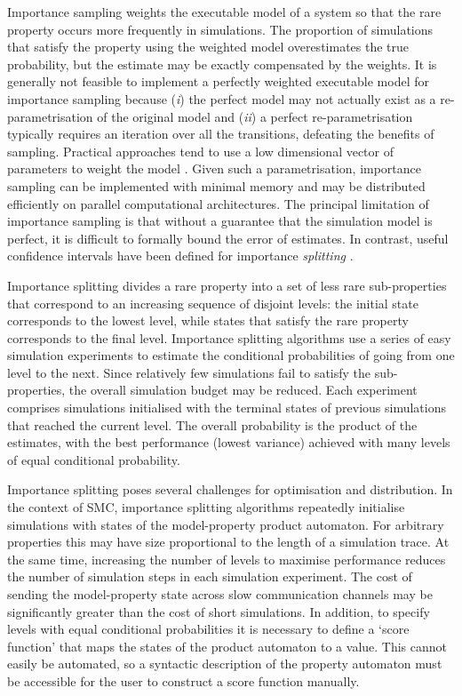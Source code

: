 \documentclass{llncs}
\begin{document}
Importance sampling weights the executable model of a system so that
the rare property occurs more frequently in simulations. The proportion
of simulations that satisfy the property using the weighted model
overestimates the true probability, but the estimate may be exactly
compensated by the weights. It is generally not feasible to implement
a perfectly weighted executable model for importance sampling because
(\emph{i}) the perfect model may not actually exist as a re-parametrisation
of the original model and (\emph{ii}) a perfect re-parametrisation
typically requires an iteration over all the transitions, defeating
the benefits of sampling. Practical approaches tend to use a low dimensional
vector of parameters to weight the model \cite{SedwardsJegourelLegay2012,JegourelLegaySedwards2012}.
Given such a parametrisation, importance sampling can be implemented
with minimal memory and may be distributed efficiently on parallel
computational architectures. The principal limitation of importance
sampling is that without a guarantee that the simulation model is
perfect, it is difficult to formally bound the error of estimates.
In contrast, useful confidence intervals have been defined for importance
\emph{splitting} \cite{CerouGuyader2007,CerouDelMoralFuronGuyader2012}.

Importance splitting divides a rare property into a set of less rare
sub-properties that correspond to an increasing sequence of disjoint
levels: the initial state corresponds to the lowest level, while states
that satisfy the rare property corresponds to the final level. Importance
splitting algorithms use a series of easy simulation experiments to
estimate the conditional probabilities of going from one level to
the next. Since relatively few simulations fail to satisfy the sub-properties,
the overall simulation budget may be reduced. Each experiment comprises
simulations initialised with the terminal states of previous simulations
that reached the current level. The overall probability is the product
of the estimates, with the best performance (lowest variance) achieved
with many levels of equal conditional probability.

Importance splitting poses several challenges for optimisation and
distribution. In the context of SMC, importance splitting algorithms
repeatedly initialise simulations with states of the model-property
product automaton. For arbitrary properties this may have size proportional
to the length of a simulation trace. At the same time, increasing
the number of levels to maximise performance reduces the number of
simulation steps in each simulation experiment. The cost of sending
the model-property state across slow communication channels may be
significantly greater than the cost of short simulations. In addition,
to specify levels with equal conditional probabilities it is necessary
to define a `score function' that maps the states of the product
automaton to a value. This cannot easily be automated, so a syntactic
description of the property automaton must be accessible for the user
to construct a score function manually.
\end{document}
